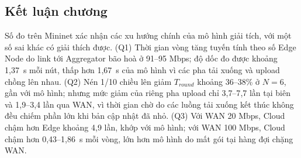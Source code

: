 \subsection{Kết luận chương}
Số đo trên Mininet xác nhận các xu hướng chính của mô hình giải tích, với một số sai khác có giải thích được. (Q1) Thời gian vòng tăng tuyến tính theo số Edge Node do link tới Aggregator bão hoà ở 91--95 Mbps; độ dốc đo được khoảng 1{,}37~s mỗi nút, thấp hơn 1{,}67~s của mô hình vì các pha tải xuống và upload chồng lên nhau. (Q2) Nén 1/10 chiều lên giảm $T_{round}$ khoảng 36--38\% ở $N = 6$, gần với mô hình; nhưng mức giảm của riêng pha upload chỉ 3{,}7--7{,}7 lần tại biên và 1{,}9--3{,}4 lần qua WAN, vì thời gian chờ do các luồng tải xuống kết thúc không đều chiếm phần lớn khi bản cập nhật đã nhỏ. (Q3) Với WAN 20 Mbps, Cloud chậm hơn Edge khoảng 4{,}9 lần, khớp với mô hình; với WAN 100 Mbps, Cloud chậm hơn 0{,}43--1{,}86~s mỗi vòng, lớn hơn mô hình do mất gói tại hàng đợi chặng WAN.

\cleardoublepage
